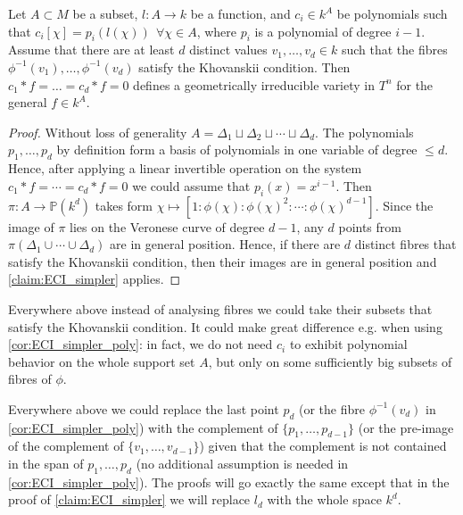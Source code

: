\begin{corollary}\label{cor:ECI_simpler_poly}
    Let $A \subset M$ be a subset, $l : A \to k$ be a function, and $c_i \in k^A$ be polynomials such that $c_i[\chi] = p_i(l(\chi))\ \ \forall \chi \in A$, where $p_i$ is a polynomial of degree $i - 1$. Assume that there are at least $d$ distinct values $v_1, \dots, v_d \in k$ such that the fibres $\phi^{-1}(v_1), \dots, \phi^{-1}(v_d)$ satisfy the Khovanskii condition.
    Then $c_1 * f = \dots = c_d * f = 0$ defines a geometrically irreducible variety in $T^n$ for the general $f \in k^A$.
\end{corollary}
\begin{proof}
    Without loss of generality $A = \Delta_1 \sqcup \Delta_2 \sqcup \cdots \sqcup \Delta_d$. The polynomials $p_1, \dots, p_d$ by definition form a basis of polynomials in one variable of degree $\le d$. Hence, after applying a linear invertible operation on the system $c_1 * f = \cdots = c_d * f = 0$ we could assume that $p_i(x) = x^{i - 1}$. Then $\pi : A \to \mathbb P(k^d)$ takes form $\chi \mapsto [1: \phi(\chi) : \phi(\chi)^2 : \cdots : \phi(\chi)^{d - 1}]$. Since the image of $\pi$ lies on the Veronese curve of degree $d - 1$, any $d$ points from $\pi(\Delta_1 \cup \cdots \cup \Delta_d)$ are in general position. Hence, if there are $d$ distinct fibres that satisfy the Khovanskii condition, then their images are in general position and \autoref{claim:ECI_simpler} applies.
\end{proof}

\begin{remark}
    Everywhere above instead of analysing fibres we could take their subsets that satisfy the Khovanskii condition. It could make great difference e.g. when using \autoref{cor:ECI_simpler_poly}: in fact, we do not need $c_i$ to exhibit polynomial behavior on the whole support set $A$, but only on some sufficiently big subsets of fibres of $\phi$.
\end{remark}

\begin{remark}\label{rem:ECI_simpler_unsimpler}
    Everywhere above we could replace the last point $p_d$ (or the fibre $\phi^{-1}(v_d)$ in \autoref{cor:ECI_simpler_poly}) with the complement of $\{ p_1, \dots, p_{d - 1} \}$ (or the pre-image of the complement of $\{ v_1, \dots, v_{d - 1} \}$) given that the complement is not contained in the span of $p_1, \dots, p_d$ (no additional assumption is needed in \autoref{cor:ECI_simpler_poly}). The proofs will go exactly the same except that in the proof of \autoref{claim:ECI_simpler} we will replace $l_d$ with the whole space $k^d$.
\end{remark}

